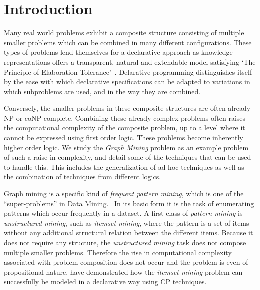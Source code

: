 \section{Introduction}
Many real world problems exhibit a composite structure consisting of multiple smaller problems which can be combined in many different configurations.
These types of problems lend themselves for a declarative approach as knowledge representations offers a transparent, natural and extendable model satisfying `The Principle of Elaboration Tolerance'~\citep{elaboration_tolerance}.
Delarative programming distinguishes itself by the ease with which declarative specifications can be adapted to variations in which subproblems are used, and in the way they are combined.

Conversely, the smaller problems in these composite structures are often already NP or coNP complete.
Combining these already complex problems often raises the computational complexity of the composite problem, up to a level where it cannot be expressed using first order logic. These problems become inherently higher order logic.
We study the \emph{Graph Mining} problem as an example problem of such a raise in complexity, and detail some of the techniques that can be used to handle this.
This includes the generalization of ad-hoc techniques as well as the combination of techniques from different logics.

Graph mining is a specific kind of \emph{frequent pattern mining}, which is one of the ``super-problems'' in Data Mining.~\cite{}
In its basic form it is the task of enumerating patterns which occur frequently in a dataset.
A first class of \emph{pattern mining} is \emph{unstructured mining}, such as \emph{itemset mining}, where the pattern is a set of items without any additional structural relation between the different items. 
Because it does not require any structure, the \emph{unstructured mining} task does not compose multiple smaller problems.
Therefore the rise in computational complexity associated with problem composition does not occur and the problem is even of propositional nature.
\citet{tias_original} have demonstrated how the \emph{itemset mining} problem can successfully be modeled in a declarative way using CP techniques.

